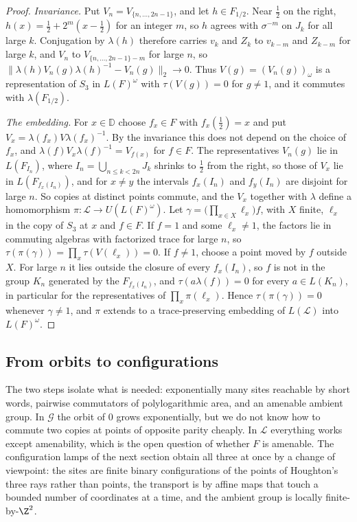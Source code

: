 \begin{proof}
\emph{Invariance.} Put $V_n=V_{\{n,\dots,2n-1\}}$, and let $h\in F_{1/2}$. Near $\frac12$ on the right, $h(x)=\frac12+2^m(x-\frac12)$ for an
integer $m$, so $h$ agrees with $\sigma^{-m}$ on $J_k$ for all large $k$. Conjugation by $\lambda(h)$ therefore carries $v_k$ and $Z_k$ to
$v_{k-m}$ and $Z_{k-m}$ for large $k$, and $V_n$ to $V_{\{n,\dots,2n-1\}-m}$ for large $n$, so $\|\lambda(h)V_n(g)\lambda(h)^{-1}-V_n(g)\|_2\to0$.
Thus $V(g)=(V_n(g))_\omega$ is a representation of $S_3$ in $L(F)^\omega$ with $\tau(V(g))=0$ for $g\ne1$, and it commutes with $\lambda(F_{1/2})$.

\emph{The embedding.} For $x\in\mathbb D$ choose $f_x\in F$ with $f_x(\frac12)=x$ and put $V_x=\lambda(f_x)V\lambda(f_x)^{-1}$. By the
invariance this does not depend on the choice of $f_x$, and $\lambda(f)V_x\lambda(f)^{-1}=V_{f(x)}$ for $f\in F$. The representatives $V_n(g)$ lie
in $L(F_{I_n})$, where $I_n=\bigcup_{n\le k<2n}J_k$ shrinks to $\frac12$ from the right, so those of $V_x$ lie in $L(F_{f_x(I_n)})$, and for $x\ne y$
the intervals $f_x(I_n)$ and $f_y(I_n)$ are disjoint for large $n$. So copies at distinct points commute, and the $V_x$ together with $\lambda$
define a homomorphism $\pi:\mathcal L\to U(L(F)^\omega)$. Let $\gamma=\bigl(\prod_{x\in X}\ell_x\bigr)f$, with $X$ finite, $\ell_x$ in the copy of $S_3$
at $x$ and $f\in F$. If $f=1$ and some $\ell_x\ne1$, the factors lie in commuting algebras with factorized trace for large $n$, so
$\tau(\pi(\gamma))=\prod_x\tau(V(\ell_x))=0$. If $f\ne1$, choose a point moved by $f$ outside $X$. For large $n$ it lies outside the closure of
every $f_x(I_n)$, so $f$ is not in the group $K_n$ generated by the $F_{f_x(I_n)}$, and $\tau(a\lambda(f))=0$ for every $a\in L(K_n)$, in
particular for the representatives of $\prod_x\pi(\ell_x)$. Hence $\tau(\pi(\gamma))=0$ whenever $\gamma\ne1$, and $\pi$ extends to a
trace-preserving embedding of $L(\mathcal L)$ into $L(F)^\omega$.
\end{proof}

\subsection{From orbits to configurations}\label{sec:toward}

The two steps isolate what is needed: exponentially many sites reachable by short words, pairwise commutators of polylogarithmic area, and an
amenable ambient group. In $\mathcal G$ the orbit of $0$ grows exponentially, but we do not know how to commute two copies at points of
opposite parity cheaply. In $\mathcal L$ everything works except amenability, which is the open question of whether $F$ is amenable. The
configuration lamps of the next section obtain all three at once by a change of viewpoint: the sites are finite binary configurations of the points of Houghton's three rays
rather than points, the transport is by affine maps that touch a bounded number of coordinates at a time, and the ambient group is locally
finite-by-$\Z^2$.
